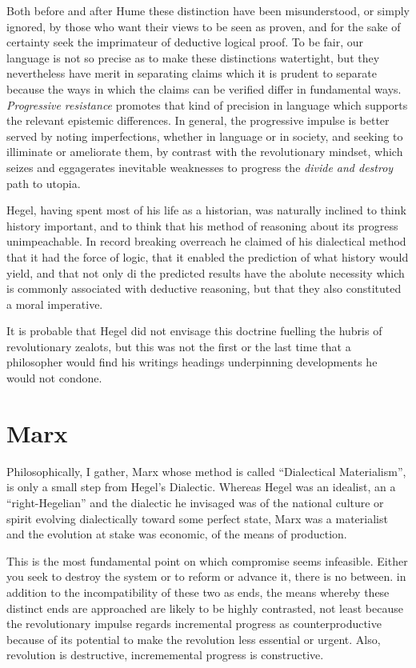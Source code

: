 \documentclass[10pt,titlepage]{article}
\begin{document}
Both before and after Hume these distinction have been misunderstood, or simply ignored, by those who want their views to be seen as proven, and for the sake of certainty seek the imprimateur of deductive logical proof.
To be fair, our language is not so precise as to make these distinctions watertight, but they nevertheless have merit in separating claims which it is prudent to separate because the ways in which the claims can be verified differ in fundamental ways.
\emph{Progressive resistance} promotes that kind of precision in language which supports the relevant epistemic differences.
In general, the progressive impulse is better served by noting imperfections, whether in language or in society, and seeking to illiminate or ameliorate them, by contrast with the revolutionary mindset, which seizes and eggagerates inevitable weaknesses to progress the \emph{divide and destroy} path to utopia.

Hegel, having spent most of his life as a historian, was naturally inclined to think history important, and to think that his method of reasoning about its progress unimpeachable.
In record breaking overreach he claimed of his dialectical method that it had the force of logic, that it enabled the prediction of what history would yield, and that not only di the predicted results have the abolute necessity which is commonly associated with deductive reasoning, but that they also constituted a moral imperative.

It is probable that Hegel did not envisage this doctrine fuelling the hubris of revolutionary zealots, but this was not the first or the last time that a philosopher would find his writings headings underpinning developments he would not condone.


\section{Marx}

Philosophically, I gather, Marx whose method is called ``Dialectical Materialism'', is only a small step from Hegel's Dialectic.
Whereas Hegel was an idealist, an a ``right-Hegelian'' and the dialectic he invisaged was of the national culture or spirit evolving dialectically toward some perfect state, Marx was a materialist and the evolution at stake was economic, of the means of production.

This is the most fundamental point on which compromise seems infeasible.
Either you seek to destroy the system or to reform or advance it, there is no between.
in addition to the incompatibility of these two as ends, the means whereby these distinct ends are approached are likely to be highly contrasted, not least because the revolutionary impulse regards incremental progress as counterproductive because of its potential to make the revolution less essential or urgent.
Also, revolution is destructive, incrememental progress is constructive.
\end{document}
